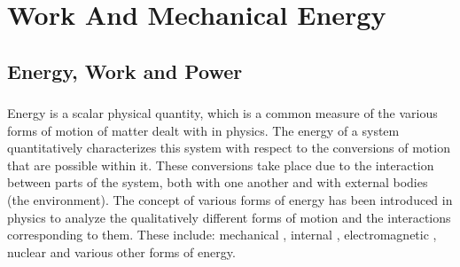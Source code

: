 

\chapter{Work And Mechanical Energy}
\label{ch-03}

\section{Energy, Work and Power}
\label{sec-3.1}
\subsection{}\label{3.1.1} Energy is a scalar physical quantity, which is a common measure of the various forms of motion of matter dealt with in physics. The energy of a system quantitatively characterizes this system with respect to the conversions of motion that are possible within it. These conversions take place due to the in­teraction between parts of the system, both with one another and with external bodies (the environment). The concept of various forms of energy has been introduced in physics to ana­lyze the qualitatively different forms of motion and the interac­tions corresponding to them. These include: mechanical , internal , electromagnetic , nuclear  and various other forms of energy.

